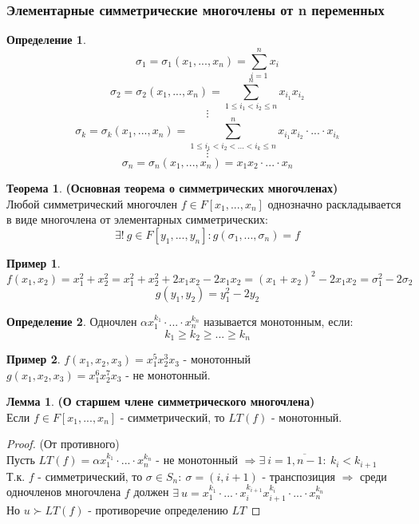 \documentclass[a4paper, 12pt]{article}
\newcommand\tab[1][.5cm]{\hspace*{#1}}
\newcounter{lemcount}
\newcounter{lemcount2}
\newcounter{thcount}
\theoremstyle{definition}
\newtheorem*{definition}{Определение}
\newtheorem*{example1}{Пример}
\newtheorem{lemmanum}[lemcount]{Лемма}
\newtheorem{theoremnum}[thcount]{Теорема}
\begin{document}
  \subsubsection{Элементарные симметрические многочлены от n переменных}
  \begin{definition}
    $$\sigma_1 = \sigma_1(x_1,...,x_n) = \sum \limits_{i=1}^n x_i$$
    $$\sigma_2 = \sigma_2(x_1,...,x_n) = \sum \limits_{1\leq i_1 < i_2 \leq n}^n x_{i_1}x_{i_2}$$
    $$\vdots$$ 
    $$\sigma_k = \sigma_k(x_1,...,x_n) = \sum \limits_{1\leq i_1 < i_2<...<i_k \leq n}^n x_{i_1}x_{i_2} \cdot ... \cdot x_{i_k}$$
    $$\vdots$$
    $$\sigma_n = \sigma_n(x_1,...,x_n) = x_{1}x_{2} \cdot ... \cdot x_{n}$$      
  \end{definition}
  \begin{theoremnum} \textbf{(Основная теорема о симметрических многочленах)} \\
    Любой симметрический многочлен $f \in F[x_1,...,x_n]$ однозначно раскладывается в виде многочлена от элементарных симметрических: 
    $$\exists ! \ g \in F[y_1,...,y_n] : g(\sigma_1,...,\sigma_n) = f$$
  \end{theoremnum}
  \begin{example1}
    $$f(x_1, x_2) = x_1^2 + x_2^2 = x_1^2 + x_2^2 + 2x_1x_2 - 2x_1x_2 = (x_1+x_2)^2 - 2x_1x_2 = \sigma_1^2 - 2 \sigma_2$$
    $$g(y_1,y_2) = y_1^2 - 2y_2$$  
  \end{example1}
  \begin{definition}
    Одночлен $\alpha x_1^{k_1} \cdot ... \cdot x_n^{k_n}$ называется монотонным, если: 
    $$k_1\geq k_2 \geq ... \geq k_n$$  
  \end{definition}
  \begin{example1}
    $f(x_1,x_2,x_3) = x_1^5x_2^3x_3$ - монотонный \\
    \tab[2.33cm]$g(x_1,x_2,x_3) = x_1^6x_2^7x_3$ - не монотонный.  
  \end{example1}
  \setcounter{lemcount}{0}
  \begin{lemmanum} \textbf{(О старшем члене симметрического многочлена)} \\
    Если $f \in F[x_1,...,x_n]$ - симметрический, то $LT(f)$ - монотонный. 
  \end{lemmanum}
  \begin{proof} (От противного)\\
    Пусть $LT(f) = \alpha x_1^{k_1} \cdot ... \cdot x_n^{k_n}$ - не монотонный $\Longrightarrow \exists \ i = \overline{1,n-1}: \ k_i<k_{i+1}$\\
    Т.к. $f$ - симметрический, то $\sigma \in S_n: \ \sigma = (i, i+1)$ - транспозиция $\Longrightarrow $ среди одночленов многочлена $f$ должен $\exists \ u = x_1^{k_1} \cdot ... \cdot x_i^{k_{i+1}}x_{i+1}^{k_i} \cdot ... \cdot x_n^{k_n}$\\
    Но $u \succ LT(f)$ - противоречие определению $LT$    
  \end{proof}
\end{document}

